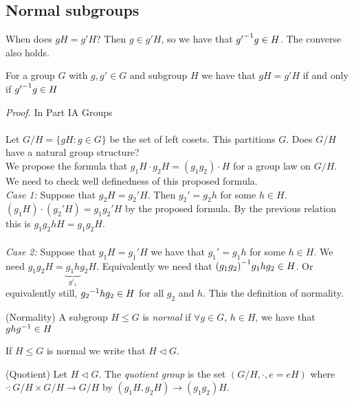 \documentclass{article}
\begin{document}
\begin{itemize}
\subsection{Normal subgroups}
When does $ gH=g'H $? Then $ g\in g'H $, so we have that $ {g'}^{-1}g\in H $. The converse also holds.
\begin{lemma}
	For a group $ G $ with $ g, g'\in G $ and subgroup $ H $ we have that $ gH=g'H $ if and only if $ {g'}^{-1} g\in H $
\end{lemma}
\textit{Proof.} In Part IA Groups\\\\ 
Let $ G/H = \{gH:g\in G\} $ be the set of left cosets. This partitions $ G $. Does $ G/H $ have a natural group structure?\\
We propose the formula that $ g_1H\cdot g_2H=(g_1g_2)\cdot H $ for a group law on $ G/H $.\\
We need to check well definedness of this proposed formula.\\
\textit{Case 1:} Suppose that $ g_2H=g_2'H. $ Then $ g_2'=g_2h $ for some $ h\in H $. $ (g_1H)\cdot (g_2'H)=g_1g_2'H $ by the proposed formula. By the previous relation this is $ g_1g_2hH=g_1g_2H $.\\\\
\textit{Case 2:} Suppose that $ g_1H=g_1'H $ we have that $ g_1'=g_1h $ for some $ h\in H $. We need $ g_1g_2 H = \underbrace{g_1h}_{g'_1}g_2H $. Equivalently we need that $ {(g_1g_2)}^{-1}g_1hg_2\in H $. Or equivalently still, $ {g_2}^{-1}hg_2\in H $ for all $ g_2 $ and $ h $. This the definition of normality.
\begin{definition}
		(Normality) A subgroup $ H\le G $ is \textit{normal} if $ \forall g \in G $, $ h\in H $, we have that $ gh{g}^{-1}\in H $
\end{definition}
If $ H\le G $ is normal we write that $ H \triangleleft G $.
\begin{definition}
	(Quotient) Let $ H\triangleleft G $. The \textit{quotient group} is the set $ (G/H, \cdot, e=eH) $ where $ \cdot:G/H\times G/H \rightarrow G/H $ by $ (g_1H,g_2H)\rightarrow (g_1g_2)H $.
\end{definition}


\end{itemize}
\end{document}
